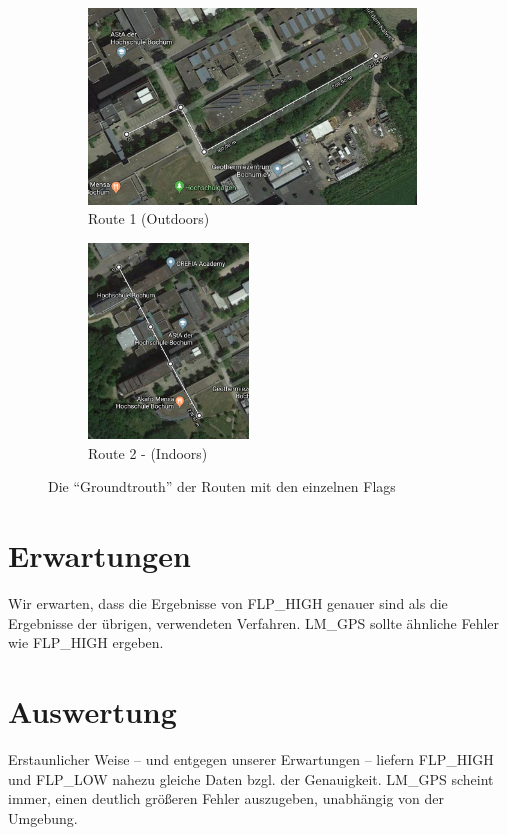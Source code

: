 \begin{figure}[h!]
	\centering
	\begin{subfigure}[b]{.64\textwidth}
		\centering
        \includegraphics[height=5.2cm]{route1}
        \caption{Route  1 (Outdoors)}
        \label{fig:route1}
    \end{subfigure}
    \begin{subfigure}[b]{.35\textwidth}
    	\centering
        \includegraphics[height=5.2cm]{route2}
        \caption{Route 2 - (Indoors)}
        \label{fig:route2}
    \end{subfigure}
    \caption{Die "`Groundtrouth"' der Routen mit den einzelnen Flags}
    \label{fig:routen}
\end{figure}

\section{Erwartungen}

Wir erwarten, dass die Ergebnisse von FLP\_HIGH genauer sind als die Ergebnisse der übrigen, verwendeten Verfahren. LM\_GPS sollte ähnliche Fehler wie FLP\_HIGH ergeben. 

	
\section{Auswertung}	

Erstaunlicher Weise -- und entgegen unserer Erwartungen -- liefern FLP\_HIGH und FLP\_LOW nahezu gleiche Daten bzgl. der Genauigkeit. LM\_GPS scheint immer, einen deutlich größeren Fehler auszugeben, unabhängig von der Umgebung.

